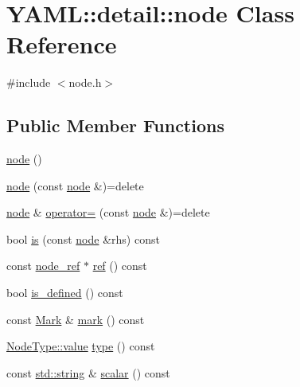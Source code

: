 \hypertarget{class_y_a_m_l_1_1detail_1_1node}{}\section{Y\+A\+ML\+::detail\+::node Class Reference}
\label{class_y_a_m_l_1_1detail_1_1node}


{\ttfamily \#include $<$node.\+h$>$}

\subsection*{Public Member Functions}
\begin{DoxyCompactItemize}
\item 
\mbox{\hyperlink{class_y_a_m_l_1_1detail_1_1node_a91b767e9ac6981ac7084ef9a982857a8}{node}} ()
\item 
\mbox{\hyperlink{class_y_a_m_l_1_1detail_1_1node_a1b9862913ca0cf80a8867ee6b5d2673b}{node}} (const \mbox{\hyperlink{class_y_a_m_l_1_1detail_1_1node}{node}} \&)=delete
\item 
\mbox{\hyperlink{class_y_a_m_l_1_1detail_1_1node}{node}} \& \mbox{\hyperlink{class_y_a_m_l_1_1detail_1_1node_a87ad321532ecddcccca9166bc85b325c}{operator=}} (const \mbox{\hyperlink{class_y_a_m_l_1_1detail_1_1node}{node}} \&)=delete
\item 
bool \mbox{\hyperlink{class_y_a_m_l_1_1detail_1_1node_ab9c9991697c59ac00def1d5192c1eedf}{is}} (const \mbox{\hyperlink{class_y_a_m_l_1_1detail_1_1node}{node}} \&rhs) const
\item 
const \mbox{\hyperlink{class_y_a_m_l_1_1detail_1_1node__ref}{node\+\_\+ref}} $\ast$ \mbox{\hyperlink{class_y_a_m_l_1_1detail_1_1node_ac788238590a4267c01b36497ff5bd6c1}{ref}} () const
\item 
bool \mbox{\hyperlink{class_y_a_m_l_1_1detail_1_1node_a18d5d6bb65a79aa3ea9067e5194167ad}{is\+\_\+defined}} () const
\item 
const \mbox{\hyperlink{struct_y_a_m_l_1_1_mark}{Mark}} \& \mbox{\hyperlink{class_y_a_m_l_1_1detail_1_1node_a169bedca09bd0ee2b5b5a867f04ce4a0}{mark}} () const
\item 
\mbox{\hyperlink{struct_y_a_m_l_1_1_node_type_af83cf3f3c2eca0bf0eae1bbf981e86c4}{Node\+Type\+::value}} \mbox{\hyperlink{class_y_a_m_l_1_1detail_1_1node_a5527fb2ef1005527911cc2b66b553601}{type}} () const
\item 
const \mbox{\hyperlink{glad_8h_ac83513893df92266f79a515488701770}{std\+::string}} \& \mbox{\hyperlink{class_y_a_m_l_1_1detail_1_1node_a668af98822f9340b7bc97bb5fa0fbe97}{scalar}} () const

\end{DoxyCompactItemize}

